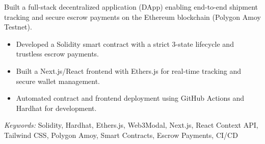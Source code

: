 \nointent {}
 
 
\nointent Built a full-stack decentralized application (DApp) enabling end-to-end shipment tracking and secure escrow payments on the Ethereum blockchain (Polygon Amoy Testnet). 
 
\begin{itemize} 
    \item Developed a Solidity smart contract with a strict 3-state lifecycle and trustless escrow payments. 
    \item Built a Next.js/React frontend with Ethers.js for real-time tracking and secure wallet management. 
    \item Automated contract and frontend deployment using GitHub Actions and Hardhat for development. 
\end{itemize} 
 
\nointent \textit{Keywords:} Solidity, Hardhat, Ethers.js, Web3Modal, Next.js, React Context API, Tailwind CSS, Polygon Amoy, Smart Contracts, Escrow Payments, CI/CD 
